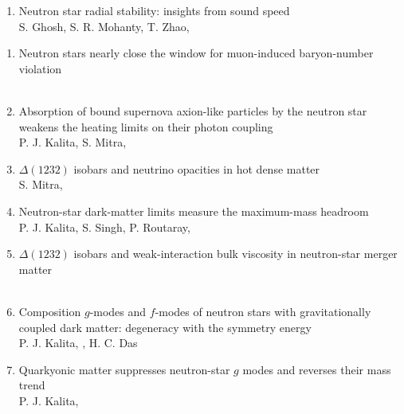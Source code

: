 \begin{enumerate}
\item Neutron star radial stability: insights from sound speed\\
S. Ghosh, S. R. Mohanty, T. Zhao, \me\\
\quad
{}
\end{enumerate}

\begin{enumerate}
\item Neutron stars nearly close the window for muon-induced baryon-number
violation\\
\lead \me\\

\item Absorption of bound supernova axion-like particles by the neutron star
weakens the heating limits on their photon coupling\\
P. J. Kalita, S. Mitra, \me\\

\item $\Delta(1232)$ isobars and neutrino opacities in hot dense matter\\
S. Mitra, \me\\

\item Neutron-star dark-matter limits measure the maximum-mass headroom\\
P. J. Kalita, S. Singh, P. Routaray, \me\\

\item \lead $\Delta(1232)$ isobars and weak-interaction bulk viscosity in
neutron-star merger matter\\
\me\\

\item Composition $g$-modes and $f$-modes of neutron stars with gravitationally
coupled dark matter: degeneracy with the symmetry energy\\
P. J. Kalita, \me, H. C. Das\\

\item Quarkyonic matter suppresses neutron-star $g$ modes and reverses their
mass trend\\
P. J. Kalita, \me\\


\end{enumerate}
